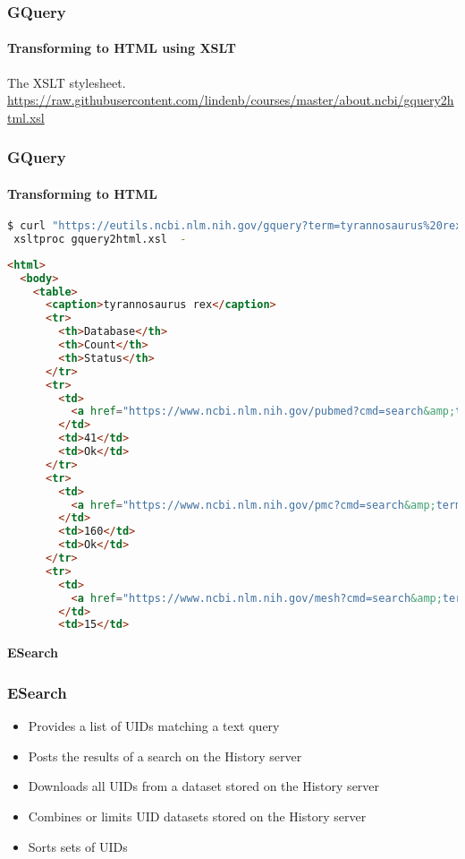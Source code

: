 \documentclass{beamer}
\newcommand{\centeredtitle}[1]{
\begin{center}
    \Huge{\bf{#1}}
\end{center}
}
\newcommand{\hugeslide}[1]{
\begin{frame}
\centeredtitle{#1}
\end{frame}
}
\begin{document}
\begin{frame}[fragile]
\frametitle{GQuery}
\framesubtitle{Transforming to HTML using XSLT}
The XSLT stylesheet. \url{https://raw.githubusercontent.com/lindenb/courses/master/about.ncbi/gquery2html.xsl}

\end{frame}

\begin{frame}[fragile]
\frametitle{GQuery}
\framesubtitle{Transforming to HTML}
\begin{lstlisting}[language=bash,basicstyle=\tiny,breaklines=true]
 $ curl "https://eutils.ncbi.nlm.nih.gov/gquery?term=tyrannosaurus%20rex&retmode=xml" |\
 xsltproc gquery2html.xsl  -
\end{lstlisting}

\begin{lstlisting}[language=html,basicstyle=\tiny,breaklines=false]
<html>
  <body>
    <table>
      <caption>tyrannosaurus rex</caption>
      <tr>
        <th>Database</th>
        <th>Count</th>
        <th>Status</th>
      </tr>
      <tr>
        <td>
          <a href="https://www.ncbi.nlm.nih.gov/pubmed?cmd=search&amp;term=tyrannosaurus+rex">pubmed</a>
        </td>
        <td>41</td>
        <td>Ok</td>
      </tr>
      <tr>
        <td>
          <a href="https://www.ncbi.nlm.nih.gov/pmc?cmd=search&amp;term=tyrannosaurus+rex">pmc</a>
        </td>
        <td>160</td>
        <td>Ok</td>
      </tr>
      <tr>
        <td>
          <a href="https://www.ncbi.nlm.nih.gov/mesh?cmd=search&amp;term=tyrannosaurus+rex">mesh</a>
        </td>
        <td>15</td>
\end{lstlisting}
\end{frame}



\hugeslide{ESearch}

\begin{frame}[fragile]
\frametitle{ESearch}
\begin{itemize}
\item Provides a list of UIDs matching a text query
\item Posts the results of a search on the History server
\item Downloads all UIDs from a dataset stored on the History server
\item Combines or limits UID datasets stored on the History server
\item Sorts sets of UIDs
\end{itemize}
\end{frame}
\end{document}
